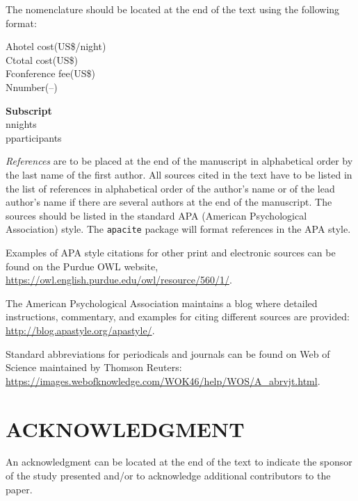 \documentclass[10pt]{extarticle}
\begin{document}
The nomenclature should be located at the end of the text using the following format:\\
\begin{samepage}
A\tabto{1.0in}hotel cost\tabto{2.5in}(US\$/night)	\\
C\tabto{1.0in}total cost\tabto{2.5in}(US\$)	\\
F\tabto{1.0in}conference fee\tabto{2.5in}(US\$)\\	
N\tabto{1.0in}number\tabto{2.5in}(–)

\end{samepage}
\begin{samepage}
\textbf{Subscript}\\
n\tabto{1.0in}nights	\\
p\tabto{1.0in}participants
\end{samepage}



\vspace{24pt}
\emph{References} are to be placed at the end of the manuscript in alphabetical order by the last name of the first author.  All sources cited in the text have to be listed in the list of references in alphabetical order of the author's name or of the lead author's name if there are several authors at the end of the manuscript.  The sources should be listed in the standard APA (American Psychological Association) style.  The \texttt{apacite} package will format references in the APA style. 

Examples of APA style citations for other print and electronic sources can be found on the Purdue OWL website, \url{https://owl.english.purdue.edu/owl/resource/560/1/}.

The American Psychological Association maintains a blog where detailed instructions, commentary, and examples for citing different sources are provided: \url{http://blog.apastyle.org/apastyle/}.

Standard abbreviations for periodicals and journals can be found on Web of Science maintained by Thomson Reuters: \url{https://images.webofknowledge.com/WOK46/help/WOS/A_abrvjt.html}.  

\section*{ACKNOWLEDGMENT}

An acknowledgment can be located at the end of the text to indicate the sponsor of the study presented and/or to acknowledge additional contributors to the paper. 
\end{document}
